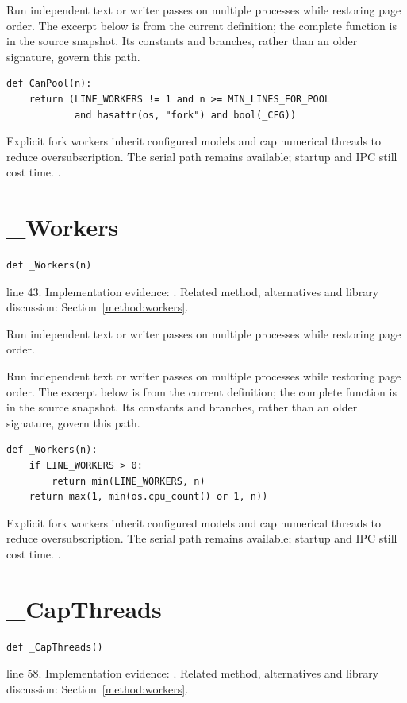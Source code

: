 Run independent text or writer passes on multiple processes while restoring page order. The excerpt below is from the current definition; the complete function is in the source snapshot. Its constants and branches, rather than an older signature, govern this path.


\begin{lstlisting}[style=plain]
def CanPool(n):
    return (LINE_WORKERS != 1 and n >= MIN_LINES_FOR_POOL
            and hasattr(os, "fork") and bool(_CFG))
\end{lstlisting}
Explicit fork workers inherit configured models and cap numerical threads to reduce oversubscription. The serial path remains available; startup and IPC still cost time. \cite{pythonmp,numpymatmul}.


\section{\_Workers}\label{fn:web-lineworkers:-Workers}
\begin{lstlisting}[style=sig]
def _Workers(n)
\end{lstlisting}
 line 43. Implementation evidence: \cite{code2026}. Related method, alternatives and library discussion: Section~\ref{method:workers}.


Run independent text or writer passes on multiple processes while restoring page order.


Run independent text or writer passes on multiple processes while restoring page order. The excerpt below is from the current definition; the complete function is in the source snapshot. Its constants and branches, rather than an older signature, govern this path.


\begin{lstlisting}[style=plain]
def _Workers(n):
    if LINE_WORKERS > 0:
        return min(LINE_WORKERS, n)
    return max(1, min(os.cpu_count() or 1, n))
\end{lstlisting}
Explicit fork workers inherit configured models and cap numerical threads to reduce oversubscription. The serial path remains available; startup and IPC still cost time. \cite{pythonmp,numpymatmul}.


\section{\_CapThreads}\label{fn:web-lineworkers:-CapThreads}
\begin{lstlisting}[style=sig]
def _CapThreads()
\end{lstlisting}
 line 58. Implementation evidence: \cite{code2026}. Related method, alternatives and library discussion: Section~\ref{method:workers}.


